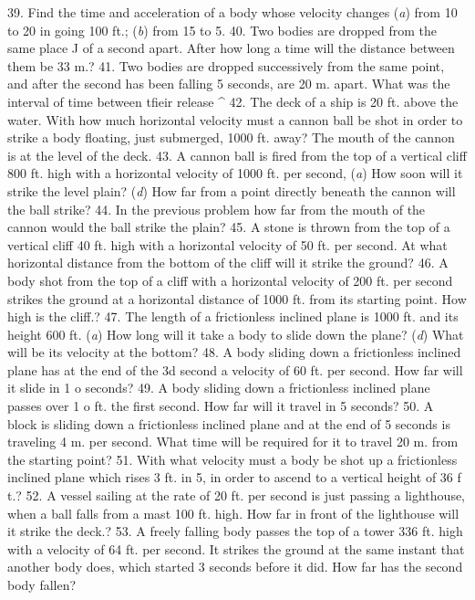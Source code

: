 39. Find the time and acceleration of a body whose velocity changes (\emph{a}) from 10 to 20 in going 100 ft.; (\emph{b}) from 15 to 5.
40. Two bodies are dropped from the same place J of a second apart. After how long a time will the distance between them be 33 m.?
41. Two bodies are dropped successively from the same point, and after the second has been falling 5 seconds, are 20 m. apart. What was the interval of time between tfieir release ^
42. The deck of a ship is 20 ft. above the water. With how much horizontal velocity must a cannon ball be shot in order to strike a body floating, just submerged, 1000 ft. away? The mouth of the cannon is at the level of the deck.
43. A cannon ball is fired from the top of a vertical cliff 800 ft. high with a horizontal velocity of 1000 ft. per second, (\emph{a}) How soon will it strike the level plain? (\emph{d}) How far from a point directly beneath the cannon will the ball strike?
44. In the previous problem how far from the mouth of the cannon would the ball strike the plain?
45. A stone is thrown from the top of a vertical cliff 40 ft. high with a horizontal velocity of 50 ft. per second. At what horizontal distance from the bottom of the cliff will it strike the ground?
46. A body shot from the top of a cliff with a horizontal velocity of 200 ft. per second strikes the ground at a horizontal distance of 1000 ft. from its starting point. How high is the cliff.?
47. The length of a frictionless inclined plane is 1000 ft. and its height 600 ft. (\emph{a}) How long will it take a body to slide down the plane? (\emph{d}) What will be its velocity at the bottom?
48. A body sliding down a frictionless inclined plane has at the end of the 3d second a velocity of 60 ft. per second. How far will it slide in 1 o seconds?
49. A body sliding down a frictionless inclined plane passes over 1 o ft. the first second. How far will it travel in 5 seconds?
50. A block is sliding down a frictionless inclined plane and at the end of 5 seconds is traveling 4 m. per second. What time will be required for it to travel 20 m. from the starting point?
51. With what velocity must a body be shot up a frictionless inclined plane which rises 3 ft. in 5, in order to ascend to a vertical height of 36 f t.?
52. A vessel sailing at the rate of 20 ft. per second is just passing a lighthouse, when a ball falls from a mast 100 ft. high. How far in front of the lighthouse will it strike the deck.?
53. A freely falling body passes the top of a tower 336 ft. high with a velocity of 64 ft. per second. It strikes the ground at the same instant that another body does, which started 3 seconds before it did. How far has the second body fallen?
